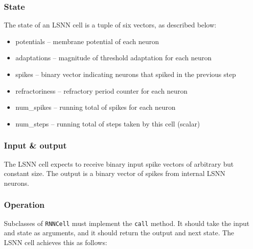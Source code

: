 \documentclass[../../report.tex]{subfiles}
\begin{document}

\subsubsection{State}
The state of an LSNN cell is a tuple of six vectors, as described below:

\begin{itemize}
  \item potentials -- membrane potential of each neuron
  \item adaptations -- magnitude of threshold adaptation for each neuron
  \item spikes -- binary vector indicating neurons that spiked in the previous step
  \item refractoriness -- refractory period counter for each neuron
  \item num\_spikes -- running total of spikes for each neuron
  \item num\_steps -- running total of steps taken by this cell (scalar)
\end{itemize}

\subsubsection{Input \& output}

The LSNN cell expects to receive binary input spike vectors of arbitrary but
constant size. The output is a binary vector of spikes from internal LSNN
neurons.

\subsubsection{Operation}

Subclasses of \texttt{RNNCell} must implement the \texttt{call} method. It
should take the input and state as arguments, and it should return the output
and next state. The LSNN cell achieves this as follows:
\end{document}
